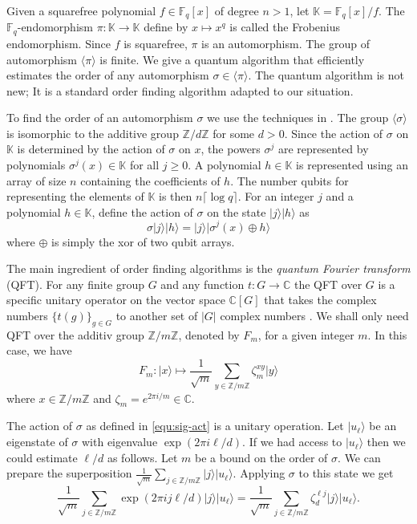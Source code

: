 \documentclass[12pt]{article}
\theoremstyle{plain}
\theoremstyle{definition}
\newcommand{\lrang}[1]{\langle#1\rangle}
\newcommand{\ldbrac}[1]{\lvert#1\rangle}
\newcommand{\abs}[1]{\left\vert#1\right\vert}
\def\C{\ensuremath{\mathbb{C}}}
\def\K{\ensuremath{\mathbb{K}}}
\def\Z{\ensuremath{\mathbb{Z}}}
\def\F{\ensuremath{\mathbb{F}}}
\begin{document}
Given a squarefree polynomial $f \in \F_q[x]$ of degree $n > 1$, let $\K = \F_q[x] / f$. The 
$\F_q$-endomorphism $\pi: \K \rightarrow \K$ define by $x \mapsto x^q$ is called the Frobenius 
endomorphism. Since $f$ is squarefree, $\pi$ is an automorphism. The group of automorphism 
$\lrang{\pi}$ is finite. We give a quantum algorithm that efficiently estimates the order of any 
automorphism $\sigma \in \lrang{\pi}$. The quantum algorithm is not new; It is a standard order 
finding algorithm adapted to our situation. 

To find the order of an automorphism $\sigma$ we use the techniques in \cite{kaye2007introduction, 
nielsen2010quantum}. The group $\lrang{\sigma}$ is isomorphic to the additive group $\Z/d\Z$ for 
some $d > 0$. Since the action of $\sigma$ on $\K$ is determined by the action of $\sigma$ on $x$, 
the powers $\sigma^j$ are represented by polynomials $\sigma^j(x) \in \K$ for all $j \ge 0$. A 
polynomial $h \in \K$ is represented using an array of size $n$ containing the coefficients of $h$. 
The number qubits for representing the elements of $\K$ is then $n\lceil \log q \rceil$. For an 
integer $j$ and a polynomial $h \in \K$, define the action of $\sigma$ on the state $\ldbrac{j} 
\ldbrac{h}$ as
\begin{equation}
	\label{equ:sig-act}
	\sigma \ldbrac{j}\ldbrac{h} = \ldbrac{j}\ldbrac{\sigma^j(x) \oplus h}
\end{equation}
where $\oplus$ is simply the xor of two qubit arrays.

The main ingredient of order finding algorithms is the \textit{quantum Fourier transform} (QFT). 
For any finite group $G$ and any function $t: G \rightarrow \C$ the QFT over $G$ is a specific 
unitary operator on the vector space $\C[G]$ that takes the complex numbers $\{ t(g) \}_{g \in 
G}$ to another set of $\abs{G}$ complex numbers \cite{hallgren2003hidden}. We shall only need QFT 
over the additiv group $\Z/m\Z$, denoted by $F_m$, for a given integer $m$. In this case, we have 
\[ F_m: \ldbrac{x} \longmapsto \frac{1}{\sqrt{m}}\sum_{y \in \Z/m\Z}\zeta_m^{xy}\ldbrac{y} \]
where $x \in \Z/m\Z$ and $\zeta_m = e^{2\pi i / m} \in \C$. 

The action of $\sigma$ as defined in \eqref{equ:sig-act} is a unitary operation. Let 
$\ldbrac{u_\ell}$ be an eigenstate of $\sigma$ with eigenvalue $\exp(2\pi i\ell / d)$. If we had 
access to $\ldbrac{u_\ell}$ then we could estimate $\ell / d$ as follows. Let $m$ be a bound on the 
order of $\sigma$. We can prepare the superposition $\frac{1}{\sqrt{m}}\sum_{j \in 
\Z/m\Z}\ldbrac{j} 
\ldbrac{u_\ell}$. Applying $\sigma$ to this state we get 
\[ \frac{1}{\sqrt{m}}\sum_{j \in \Z/m\Z} \exp(2\pi ij\ell / d) \ldbrac{j} \ldbrac{u_\ell} = 
\frac{1}{\sqrt{m}}\sum_{j \in \Z/m\Z} \zeta_d^{\ell j} \ldbrac{j} \ldbrac{u_\ell}. \]
\end{document}

